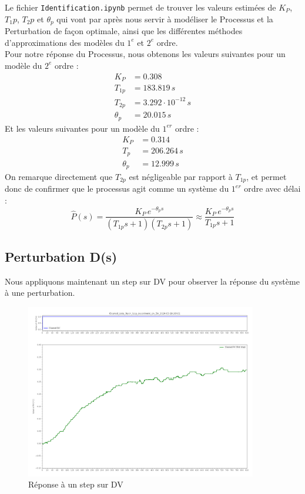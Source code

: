 \documentclass{article}
\begin{document}
Le fichier \texttt{Identification.ipynb} permet de trouver les valeurs estimées de $K_P$, $T_1p$, $T_2p$ et $\theta_p$ qui vont par après nous servir à modéliser le Processus et la Perturbation de façon optimale, ainsi que les différentes méthodes d'approximations des modèles du $1^{e}$ et $2^{e}$ ordre.\\
Pour notre réponse du Processus, nous obtenons les valeurs suivantes pour un modèle du $2^{e}$ ordre :
\begin{align*}
    K_P &= 0.308 \\
    T_{1p} &= 183.819 \,s \\
    T_{2p} &= 3.292 \cdot 10^{-12} \,s \\
    \theta_p &= 20.015 \,s
\end{align*}
Et les valeurs suivantes pour un modèle du $1^{er}$ ordre :
\begin{align*}
    K_P &= 0.314 \\
    T_{p} &= 206.264 \,s \\
    \theta_p &= 12.999 \,s
\end{align*}
On remarque directement que $T_{2p}$ est négligeable par rapport à $T_{1p}$, et permet donc de confirmer que le processus agit comme un système du $1^{er}$ ordre avec délai :
\begin{equation}
    \hat{P}(s) = \frac{K_P\,e^{-\theta_p s}}{(T_{1p}s + 1)(T_{2p}s + 1)} \approx \frac{K_P\,e^{-\theta_p s}}{T_{1p}s + 1}
\end{equation}

\subsection{Perturbation D(s)}

Nous appliquons maintenant un step sur DV pour observer la réponse du système à une perturbation.
\begin{figure}[h]
    \centering
    \includegraphics[width=0.9\textwidth]{../Plots/Graphical_methods_Cleaned_data_Open_loop_experiment_on_DV_2024-03-18-20h01.png}
    \caption{Réponse à un step sur DV}
    \label{fig:DV_step_response}
\end{figure}
\end{document}
